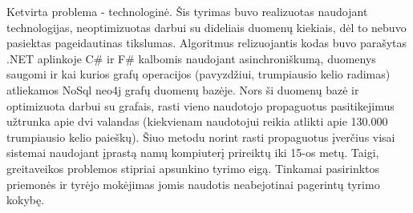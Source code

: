 \documentclass{VUMIFInfMagistrinis}
\begin{document}
\newline
\indent
Ketvirta problema - technologinė. Šis tyrimas buvo realizuotas naudojant technologijas, neoptimizuotas darbui su dideliais duomenų kiekiais, dėl to nebuvo pasiektas pageidautinas tikslumas. Algoritmus relizuojantis kodas buvo parašytas .NET aplinkoje C\# ir F\# kalbomis naudojant asinchroniškumą, duomenys saugomi ir kai kurios grafų operacijos (pavyzdžiui, trumpiausio kelio radimas) atliekamos NoSql neo4j grafų duomenų bazėje. Nors ši duomenų bazė ir optimizuota darbui su grafais, rasti vieno naudotojo propaguotus pasitikejimus užtrunka apie dvi valandas (kiekvienam naudotojui reikia atlikti apie 130.000 trumpiausio kelio paieškų). Šiuo metodu norint rasti propaguotus įverčius visai sistemai naudojant įprastą namų kompiuterį prireiktų iki 15-os metų. Taigi, greitaveikos problemos stipriai apsunkino tyrimo eigą. Tinkamai pasirinktos priemonės ir tyrėjo mokėjimas jomis naudotis neabejotinai pagerintų tyrimo kokybę.
\end{document}
